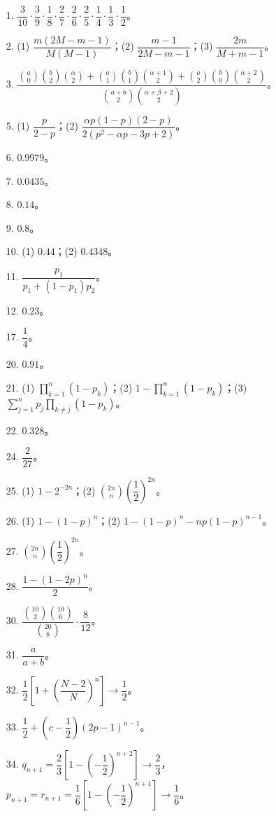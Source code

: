 \documentclass[../main.tex]{subfiles}
\begin{document}
\begin{enumerate}
\item[1.] $\dfrac{3}{10}\cdot\dfrac{3}{9}\cdot\dfrac{1}{8}\cdot\dfrac{2}{7}\cdot\dfrac{2}{6}\cdot\dfrac{2}{5}\cdot\dfrac{1}{4}\cdot\dfrac{1}{3}\cdot\dfrac{1}{2}$。
\item[2.] (1) $\dfrac{m(2M-m-1)}{M(M-1)}$；(2) $\dfrac{m-1}{2M-m-1}$；(3) $\dfrac{2m}{M+m-1}$。
\item[3.] $\dfrac{\binom{a}{0}\binom{b}{2}\binom{\alpha}{2}+\binom{a}{1}\binom{b}{1}\binom{\alpha+1}{2}+\binom{a}{2}\binom{b}{0}\binom{\alpha+2}{2}}{\binom{a+b}{2}\binom{\alpha+\beta+2}{2}}$。
\item[5.] (1) $\dfrac{p}{2-p}$；(2) $\dfrac{\alpha p(1-p)(2-p)}{2(p^{2}-\alpha p-3p+2)}$。
\item[6.] $0.9979$。
\item[7.] $0.0435$。
\item[8.] $0.14$。
\item[9.] $0.8$。
\item[10.] (1) $0.44$；(2) $0.4348$。
\item[11.] $\dfrac{p_1}{p_1+(1-p_1)p_2}$。
\item[12.] $0.23$。
\item[17.] $\dfrac{1}{4}$。
\item[20.] $0.91$。
\item[21.] (1) $\displaystyle\prod_{k=1}^{n}(1-p_k)$；(2) $1-\displaystyle\prod_{k=1}^{n}(1-p_k)$；(3) $\displaystyle\sum_{j=1}^{n}p_j\prod_{k\neq j}(1-p_k)$。
\item[22.] $0.328$。
\item[24.] $\dfrac{2}{27}$。
\item[25.] (1) $1-2^{-2n}$；(2) $\binom{2n}{n}\left(\dfrac{1}{2}\right)^{2n}$。
\item[26.] (1) $1-(1-p)^{n}$；(2) $1-(1-p)^{n}-np(1-p)^{n-1}$。
\item[27.] $\binom{2n}{n}\left(\dfrac{1}{2}\right)^{2n}$。
\item[28.] $\dfrac{1-(1-2p)^{n}}{2}$。
\item[30.] $\dfrac{\binom{10}{2}\binom{10}{6}}{\binom{20}{8}}\cdot\dfrac{8}{12}$。
\item[31.] $\dfrac{a}{a+b}$。
\item[32.] $\dfrac{1}{2}\left[1+\left(\dfrac{N-2}{N}\right)^{n}\right]\to\dfrac{1}{2}$。
\item[33.] $\dfrac{1}{2}+\left(c-\dfrac{1}{2}\right)(2p-1)^{n-1}$。
\item[34.] $q_{n+1}=\dfrac{2}{3}\left[1-\left(-\dfrac{1}{2}\right)^{n+2}\right]\to\dfrac{2}{3}$，$p_{n+1}=r_{n+1}=\dfrac{1}{6}\left[1-\left(-\dfrac{1}{2}\right)^{n+1}\right]\to\dfrac{1}{6}$。

\end{enumerate}
\end{document}

